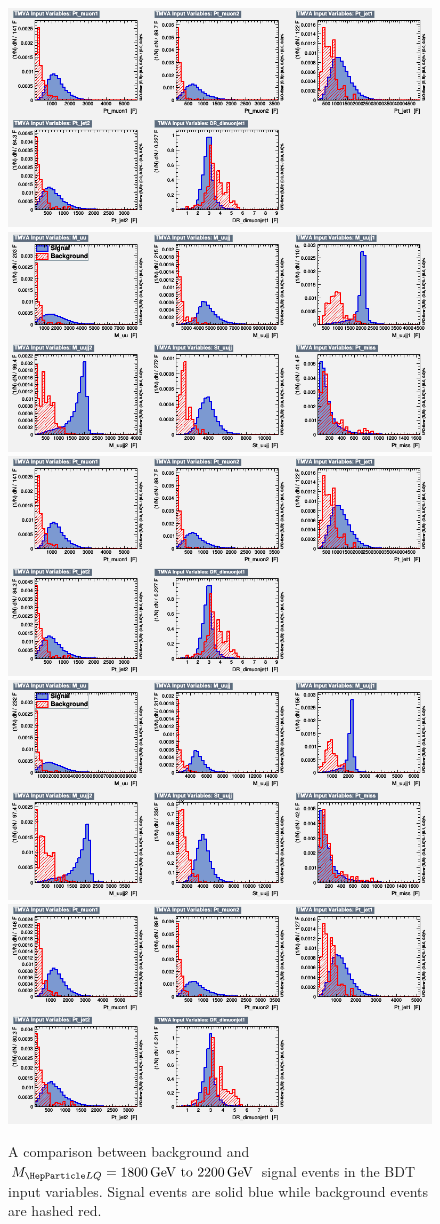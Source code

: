 \begin{figure}[H]
    {\includegraphics[width=.49\textwidth]{Images/Analysis/Results_LQToBMu_pair_uubj_BDTG_FullRun2_2023_01_25_020318/2100/variables_id_c2.png}}
    {\includegraphics[width=.49\textwidth]{Images/Analysis/Results_LQToBMu_pair_uubj_BDTG_FullRun2_2023_01_25_020318/2100/variables_id_c1.png}}
    {\includegraphics[width=.49\textwidth]{Images/Analysis/Results_LQToBMu_pair_uubj_BDTG_FullRun2_2023_01_25_020318/2100/variables_id_c2.png}}
    {\includegraphics[width=.49\textwidth]{Images/Analysis/Results_LQToBMu_pair_uubj_BDTG_FullRun2_2023_01_25_020318/2200/variables_id_c1.png}}
    {\includegraphics[width=.49\textwidth]{Images/Analysis/Results_LQToBMu_pair_uubj_BDTG_FullRun2_2023_01_25_020318/2200/variables_id_c2.png}}
    \caption{A comparison between background and $\MLQ = \SIrange{1800}{2200}{GeV}$ signal events in the BDT input variables. Signal events are solid blue while background events are hashed red.}
    \label{figapp:variables4}
\end{figure}


